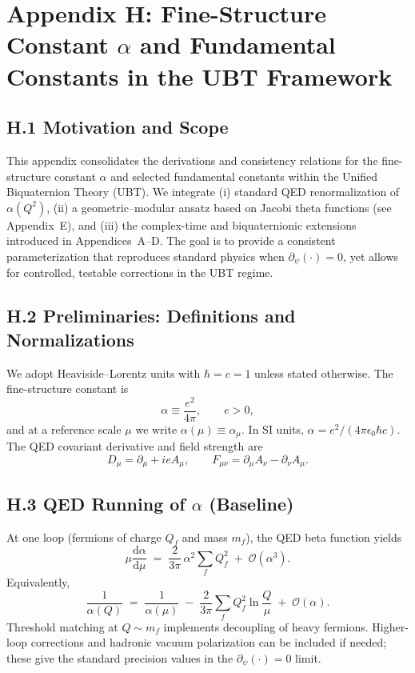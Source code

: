
\appendix
\section*{Appendix H: Fine-Structure Constant $\alpha$ and Fundamental Constants in the UBT Framework}

\subsection*{H.1 Motivation and Scope}
This appendix consolidates the derivations and consistency relations for the fine-structure constant $\alpha$ and selected fundamental constants within the Unified Biquaternion Theory (UBT). 
We integrate (i) standard QED renormalization of $\alpha(Q^2)$, (ii) a geometric--modular ansatz based on Jacobi theta functions (see Appendix~E), and (iii) the complex-time and biquaternionic extensions introduced in Appendices~A--D.
The goal is to provide a consistent parameterization that reproduces standard physics when $\partial_\psi(\cdot)=0$, yet allows for controlled, testable corrections in the UBT regime.

\subsection*{H.2 Preliminaries: Definitions and Normalizations}
We adopt Heaviside--Lorentz units with $\hbar=c=1$ unless stated otherwise. 
The fine-structure constant is
\begin{equation}
\alpha \equiv \frac{e^2}{4\pi}, \qquad e>0, 
\end{equation}
and at a reference scale $\mu$ we write $\alpha(\mu)\equiv \alpha_\mu$.
In SI units, $\alpha = e^2/(4\pi\epsilon_0 \hbar c)$.
The QED covariant derivative and field strength are
\begin{equation}
D_\mu=\partial_\mu+i e A_\mu, \qquad F_{\mu\nu}=\partial_\mu A_\nu - \partial_\nu A_\mu.
\end{equation}

\subsection*{H.3 QED Running of $\alpha$ (Baseline)}
At one loop (fermions of charge $Q_f$ and mass $m_f$), the QED beta function yields
\begin{equation}
\mu \frac{\mathrm{d}\alpha}{\mathrm{d}\mu} \;=\; \frac{2}{3\pi}\,\alpha^2 \sum_f Q_f^2 \;+\; \mathcal{O}(\alpha^3).
\end{equation}
Equivalently,
\begin{equation}
\frac{1}{\alpha(Q)} \;=\; \frac{1}{\alpha(\mu)} \;-\; \frac{2}{3\pi}\sum_f Q_f^2 \ln\!\frac{Q}{\mu} \;+\; \mathcal{O}(\alpha).
\end{equation}
Threshold matching at $Q\sim m_f$ implements decoupling of heavy fermions.
Higher-loop corrections and hadronic vacuum polarization can be included if needed; these give the standard precision values in the $\partial_\psi(\cdot)=0$ limit.

